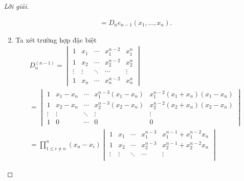\documentclass[class=linearalgebra,crop=false]{standalone}
\begin{document}
\begin{proof}[Lời giải]
\begin{enumerate}[label = (\alph*)]
\begin{align*}
                              & = D_{n}e_{n-1}(x_{1},\ldots, x_{n}).
              \end{align*}
              \endgroup
        \item
              \par Ta xét trường hợp đặc biệt
              \begin{align*}
                   & D^{(n-1)}_{n} =
                  \begin{vmatrix}
                      1      & x_{1}  & \cdots & x_{1}^{n-2} & x_{1}^{n} \\
                      1      & x_{2}  & \cdots & x_{2}^{n-2} & x_{2}^{n} \\
                      \vdots & \vdots & \ddots & \cdots      & \vdots    \\
                      1      & x_{n}  & \cdots & x_{n}^{n-2} & x_{n}^{n}
                  \end{vmatrix}                                                                                                                                                                                 \\
                   & =
                  \begin{vmatrix}
                      1      & x_{1} - x_{n} & \cdots & x_{1}^{n-3}(x_{1} - x_{n}) & x_{1}^{n-2}(x_{1} + x_{n})(x_{1} - x_{n}) \\
                      1      & x_{2} - x_{n} & \cdots & x_{2}^{n-3}(x_{2} - x_{n}) & x_{2}^{n-2}(x_{2} + x_{n})(x_{2} - x_{n}) \\
                      \vdots & \vdots        & \ddots & \vdots                     & \vdots                                    \\
                      1      & 0             & \cdots & 0                          & 0
                  \end{vmatrix}                                                                                                                           \\
                   & = \prod^{n}_{1\le i\ne n}(x_{n} - x_{i})
                  \begin{vmatrix}
                      1      & x_{1}   & \cdots & x_{1}^{n-3}   & x_{1}^{n-1} + x_{1}^{n-2}x_{n}     \\
                      1      & x_{2}   & \cdots & x_{2}^{n-3}   & x_{2}^{n-1} + x_{2}^{n-2}x_{n}     \\
                      \vdots & \vdots  & \ddots & \cdots        & \vdots                             \\

\end{vmatrix}
\end{align*}
\end{enumerate}
\end{proof}
\end{document}
